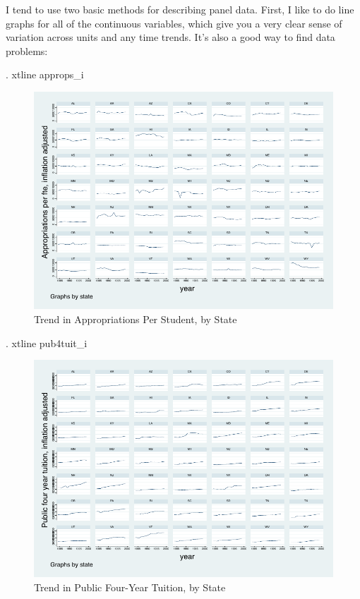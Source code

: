 \documentclass[12pt]{article}
\begin{document}
I tend to use two basic methods for describing panel data. First, I
like to do line graphs for all of the continuous variables, which give
you a very clear sense of variation across units and any time
trends. It's also a good way to find data problems:

\begin{stlog}
. xtline approps_i  
\end{stlog}



\begin{figure}[h]
  \centering
  \includegraphics[width=\textwidth]{app_line}
  \caption{Trend in Appropriations Per Student, by State}
\end{figure}

\begin{stlog}
. xtline pub4tuit_i
\end{stlog}

\begin{figure}[h]
  \centering
  \includegraphics[width=\textwidth]{tuit_line}
  \caption{Trend in Public Four-Year Tuition, by State}
\end{figure}
\end{document}
